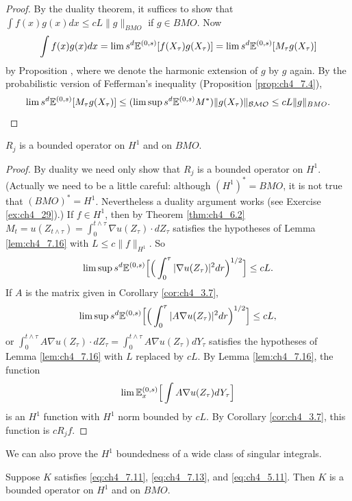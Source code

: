 \begin{proof}
By the duality theorem, it suffices to show that $\int f(x)g(x)dx \leq cL\|g\|_{BMO}$ if $g \in BMO$. Now
\[
    \int f(x)g(x)dx = \lim s^d\mathbb{E}^{(0,s)}[f(X_\tau)g(X_\tau)] = \lim s^d\mathbb{E}^{(0,s)}[M_\tau g(X_\tau)]
\]
by Proposition , where we denote the harmonic extension of $g$ by $g$ again. By the probabilistic version of Fefferman's inequality (Proposition \ref{prop:ch4_7.4}),
\[
    \lim s^d\mathbb{E}^{(0,s)}[M_\tau g(X_\tau)] \leq (\limsup s^d\mathbb{E}^{(0,s)}M^*)\|g(X_\tau)\|_{\mathcal{BMO}} \leq cL\|g\|_{BMO}.
\]
\end{proof}

\begin{corollary}\label{cor:ch4_7.17}
$R_j$ is a bounded operator on $H^1$ and on $BMO$.
\end{corollary}

\begin{proof}
By duality we need only show that $R_j$ is a bounded operator on $H^1$. (Actually we need to be a little careful: although $(H^1)^* = BMO$, it is not true that $(BMO)^* = H^1$. Nevertheless a duality argument works (see Exercise \ref{ex:ch4_29}).) If $f \in H^1$, then by Theorem \ref{thm:ch4_6.2} $M_t = u(Z_{t\wedge\tau}) = \int_0^{t\wedge\tau} \nabla u(Z_\tau)\cdot dZ_\tau$ satisfies the hypotheses of Lemma \ref{lem:ch4_7.16} with $L \leq c\|f\|_{H^1}$. So
\[
    \limsup s^d\mathbb{E}^{(0,s)}\Big[\Big(\int_0^\tau |\nabla u(Z_\tau)|^2dr\Big)^{1/2}\Big] \leq cL.
\]
If $A$ is the matrix given in Corollary \ref{cor:ch4_3.7},
\[
    \limsup s^d\mathbb{E}^{(0,s)}\Big[\Big(\int_0^\tau |A\nabla u(Z_\tau)|^2dr\Big)^{1/2}\Big] \leq cL,
\]
or $\int_0^{t\wedge\tau} A\nabla u(Z_\tau)\cdot dZ_\tau = \int_0^{t\wedge\tau} A\nabla u(Z_\tau)dY_\tau$ satisfies the hypotheses of Lemma \ref{lem:ch4_7.16} with $L$ replaced by $cL$. By Lemma \ref{lem:ch4_7.16}, the function
\[
    \lim\mathbb{E}_x^{(0,s)}\Big[\int A\nabla u(Z_\tau)dY_\tau\Big]
\]
is an $H^1$ function with $H^1$ norm bounded by $cL$. By Corollary \ref{cor:ch4_3.7}, this function is $cR_jf$.
\end{proof}


We can also prove the $H^1$ boundedness of a wide class of singular integrals.

\begin{proposition}\label{prop:ch4_7.18}
Suppose $K$ satisfies \eqref{eq:ch4_7.11}, \eqref{eq:ch4_7.13}, and \eqref{eq:ch4_5.11}. Then $K$ is a bounded operator on $H^1$ and on $BMO$.
\end{proposition}

